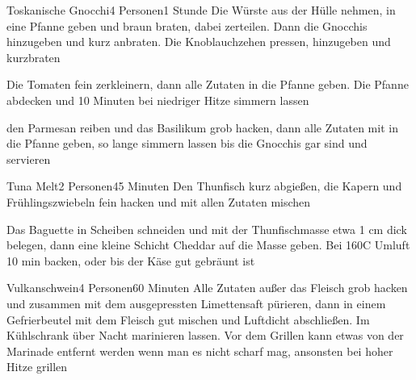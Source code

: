 \begin{recipe}{Toskanische Gnocchi}{4 Personen}{1 Stunde}
Die Würste aus der Hülle nehmen, in eine Pfanne geben und braun braten, dabei zerteilen. Dann die Gnocchis hinzugeben und kurz anbraten. Die Knoblauchzehen pressen, hinzugeben und kurzbraten

Die Tomaten fein zerkleinern, dann alle Zutaten in die Pfanne geben. Die Pfanne abdecken und 10 Minuten bei niedriger Hitze simmern lassen

den Parmesan reiben und das Basilikum grob hacken, dann alle Zutaten mit in die Pfanne geben, so lange simmern lassen bis die Gnocchis gar sind und servieren
\end{recipe}


\begin{recipe}{Tuna Melt}{2 Personen}{45 Minuten}
Den Thunfisch kurz abgießen, die Kapern und Frühlingszwiebeln fein hacken und mit allen Zutaten mischen

Das Baguette in Scheiben schneiden und mit der Thunfischmasse etwa 1 cm dick belegen, dann eine kleine Schicht Cheddar auf die Masse geben.
Bei 160\0C Umluft 10 min backen, oder bis der Käse gut gebräunt ist
\end{recipe}


\begin{recipe}{Vulkanschwein}{4 Personen}{60 Minuten}
Alle Zutaten außer das Fleisch grob hacken und zusammen mit dem ausgepressten Limettensaft pürieren, dann in einem Gefrierbeutel mit dem Fleisch gut mischen und Luftdicht abschließen.
Im Kühlschrank über Nacht marinieren lassen.
Vor dem Grillen kann etwas von der Marinade entfernt werden wenn man es nicht scharf mag, ansonsten bei hoher Hitze grillen
\end{recipe}

